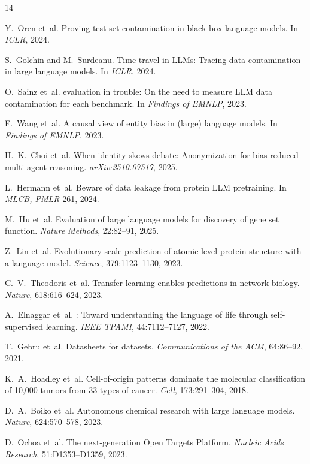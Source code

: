 \documentclass[sigconf, nonacm]{acmart}
\begin{document}

\begin{thebibliography}{14}

Y.~Oren et~al.
\newblock Proving test set contamination in black box language models.
\newblock In \textit{ICLR}, 2024.

S.~Golchin and M.~Surdeanu.
\newblock Time travel in {LLMs}: Tracing data contamination in large language models.
\newblock In \textit{ICLR}, 2024.

O.~Sainz et~al.
 evaluation in trouble: On the need to measure {LLM} data contamination for each benchmark.
\newblock In \textit{Findings of EMNLP}, 2023.

F.~Wang et~al.
\newblock A causal view of entity bias in (large) language models.
\newblock In \textit{Findings of EMNLP}, 2023.

H.~K.~Choi et~al.
\newblock When identity skews debate: Anonymization for bias-reduced multi-agent reasoning.
\newblock \textit{arXiv:2510.07517}, 2025.

L.~Hermann et~al.
\newblock Beware of data leakage from protein {LLM} pretraining.
\newblock In \textit{MLCB, PMLR} 261, 2024.

M.~Hu et~al.
\newblock Evaluation of large language models for discovery of gene set function.
\newblock \textit{Nature Methods}, 22:82--91, 2025.

Z.~Lin et~al.
\newblock Evolutionary-scale prediction of atomic-level protein structure with a language model.
\newblock \textit{Science}, 379:1123--1130, 2023.

C.~V.~Theodoris et~al.
\newblock Transfer learning enables predictions in network biology.
\newblock \textit{Nature}, 618:616--624, 2023.

A.~Elnaggar et~al.
: Toward understanding the language of life through self-supervised learning.
\newblock \textit{IEEE TPAMI}, 44:7112--7127, 2022.

T.~Gebru et~al.
\newblock Datasheets for datasets.
\newblock \textit{Communications of the ACM}, 64:86--92, 2021.

K.~A.~Hoadley et~al.
\newblock Cell-of-origin patterns dominate the molecular classification of 10,000 tumors from 33 types of cancer.
\newblock \textit{Cell}, 173:291--304, 2018.

D.~A.~Boiko et~al.
\newblock Autonomous chemical research with large language models.
\newblock \textit{Nature}, 624:570--578, 2023.

D.~Ochoa et~al.
\newblock The next-generation {Open Targets Platform}.
\newblock \textit{Nucleic Acids Research}, 51:D1353--D1359, 2023.

\end{thebibliography}
\end{document}
